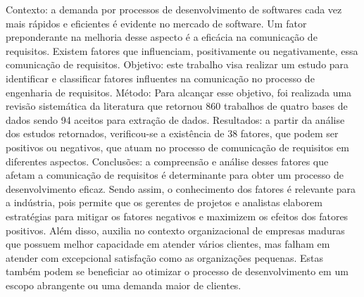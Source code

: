 Contexto: a demanda por processos de desenvolvimento de softwares cada vez mais rápidos e eficientes é evidente no mercado de software. Um fator preponderante na melhoria desse aspecto é a eficácia na comunicação de requisitos. Existem fatores que influenciam, positivamente ou negativamente, essa comunicação de requisitos. Objetivo: este trabalho visa realizar um estudo para identificar e classificar fatores influentes na comunicação no processo de engenharia de requisitos. Método: Para alcançar esse objetivo, foi realizada uma revisão sistemática da literatura que retornou 860 trabalhos de quatro bases de dados sendo 94 aceitos para extração de dados.
Resultados: a partir da análise dos estudos retornados, verificou-se a existência de 38 fatores, que podem ser positivos ou negativos, que atuam no processo de comunicação de requisitos em diferentes aspectos. Conclusões: a compreensão e análise desses fatores que afetam a comunicação de requisitos é determinante para obter um processo de desenvolvimento eficaz. Sendo assim, o conhecimento dos fatores é relevante para a indústria, pois permite que os gerentes de projetos e analistas elaborem estratégias para mitigar os fatores negativos e maximizem os efeitos dos fatores positivos. Além disso, auxilia no contexto organizacional de empresas maduras que possuem melhor capacidade em atender vários clientes, mas falham em atender com excepcional satisfação como as organizações pequenas. Estas também podem se beneficiar ao otimizar o processo de desenvolvimento em um escopo abrangente ou uma demanda maior de clientes.

 


 

